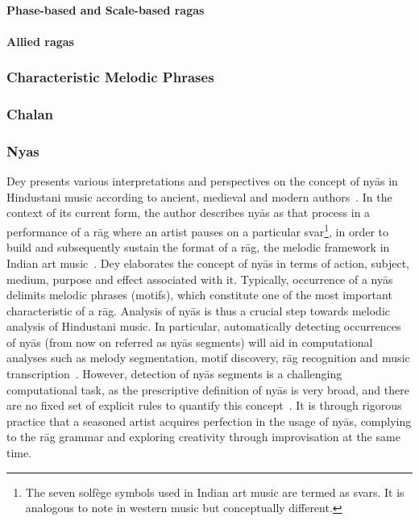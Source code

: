 \paragraph{Phase-based and Scale-based ragas}
\paragraph{Allied ragas}

\subsubsection{Characteristic Melodic Phrases}

\subsubsection{Chalan}

\subsubsection{Nyas}
\label{sec:backgroung_nyas_description}

Dey presents various interpretations and perspectives on the concept of ny\={a}s in Hindustani music according to ancient, medieval and modern authors~\cite{Dey2008}. In the context of its current form, the author describes ny\={a}s as that process in a performance of a r\={a}g where an artist pauses on a particular svar\footnote{The seven solf\`{e}ge symbols used in Indian art music are termed as svars. It is analogous to note in western music but conceptually different.}, in order to build and subsequently sustain the format of a r\={a}g, the melodic framework in Indian art music~\cite[p. 70]{Dey2008}\cite{KKG_SS13}. Dey elaborates the concept of ny\={a}s in terms of action, subject, medium, purpose and effect associated with it. Typically, occurrence of a ny\={a}s delimits melodic phrases (motifs), which constitute one of the most important characteristic of a r\={a}g. Analysis of ny\={a}s is thus a crucial step towards melodic analysis of Hindustani music. In particular, automatically detecting occurrences of ny\={a}s (from now on referred as ny\={a}s segments) will aid in computational analyses such as melody segmentation, motif discovery, r\={a}g recognition and music transcription~\cite{GopalJNMR2012, Rao2014}. However, detection of ny\={a}s segments is a challenging computational task, as the prescriptive definition of ny\={a}s is very broad, and there are no fixed set of explicit rules to quantify this concept~\cite[p. 73]{Dey2008}. It is through rigorous practice that a seasoned artist acquires perfection in the usage of ny\={a}s, complying to the r\={a}g grammar and exploring creativity through improvisation at the same time. 

